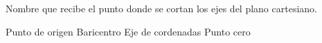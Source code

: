 
\question Nombre que recibe el punto donde se cortan los ejes del plano
          cartesiano.

  \begin{oneparchoices}
    \CorrectChoice Punto de origen
    \choice Baricentro
    \choice Eje de cordenadas
    \choice Punto cero
  \end{oneparchoices}
  \answerline[A]
